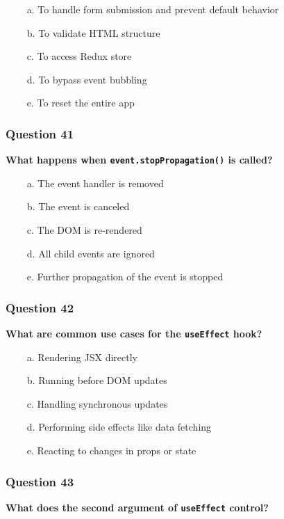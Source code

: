 \documentclass{article}
\newcommand{\cmark}{\textcolor{green}{\ding{51}}} %
\newcommand{\xmark}{\textcolor{red}{\ding{55}}}   %
\begin{document}
\begin{itemize}
  \item[\cmark\ a.] To handle form submission and prevent default behavior
  \item[\xmark\ b.] To validate HTML structure
  \item[\xmark\ c.] To access Redux store
  \item[\xmark\ d.] To bypass event bubbling
  \item[\xmark\ e.] To reset the entire app
\end{itemize}

\subsubsection*{Question 41}
\textbf{What happens when \texttt{event.stopPropagation()} is called?}

\begin{itemize}
  \item[\xmark\ a.] The event handler is removed
  \item[\xmark\ b.] The event is canceled
  \item[\xmark\ c.] The DOM is re-rendered
  \item[\xmark\ d.] All child events are ignored
  \item[\cmark\ e.] Further propagation of the event is stopped
\end{itemize}

\subsubsection*{Question 42}
\textbf{What are common use cases for the \texttt{useEffect} hook?}

\begin{itemize}
  \item[\xmark\ a.] Rendering JSX directly
  \item[\xmark\ b.] Running before DOM updates
  \item[\xmark\ c.] Handling synchronous updates
  \item[\cmark\ d.] Performing side effects like data fetching
  \item[\cmark\ e.] Reacting to changes in props or state
\end{itemize}

\subsubsection*{Question 43}
\textbf{What does the second argument of \texttt{useEffect} control?}
\end{document}

